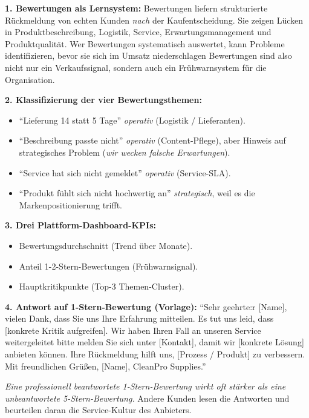 \documentclass[11pt,a4paper,oneside]{article}
\begin{document}
\begin{loesungbox}
\textbf{1. Bewertungen als Lernsystem:}
Bewertungen liefern strukturierte Rückmeldung von echten Kunden \emph{nach} der Kaufentscheidung. Sie zeigen Lücken in Produktbeschreibung, Logistik, Service, Erwartungsmanagement und Produktqualität. Wer Bewertungen systematisch auswertet, kann Probleme identifizieren, bevor sie sich im Umsatz niederschlagen \textendash{} Bewertungen sind also nicht nur ein Verkaufssignal, sondern auch ein Frühwarnsystem für die Organisation.

\textbf{2. Klassifizierung der vier Bewertungsthemen:}
\begin{itemize}
  \item ``Lieferung 14 statt 5 Tage'' \textendash{} \emph{operativ} (Logistik / Lieferanten).
  \item ``Beschreibung passte nicht'' \textendash{} \emph{operativ} (Content-Pflege), aber Hinweis auf strategisches Problem (\emph{wir wecken falsche Erwartungen}).
  \item ``Service hat sich nicht gemeldet'' \textendash{} \emph{operativ} (Service-SLA).
  \item ``Produkt fühlt sich nicht hochwertig an'' \textendash{} \emph{strategisch}, weil es die Markenpositionierung trifft.
\end{itemize}

\textbf{3. Drei Plattform-Dashboard-KPIs:}
\begin{itemize}
  \item Bewertungsdurchschnitt (Trend über Monate).
  \item Anteil 1-2-Stern-Bewertungen (Frühwarnsignal).
  \item Hauptkritikpunkte (Top-3 Themen-Cluster).
\end{itemize}

\textbf{4. Antwort auf 1-Stern-Bewertung (Vorlage):}
``Sehr geehrte:r [Name], vielen Dank, dass Sie uns Ihre Erfahrung mitteilen. Es tut uns leid, dass [konkrete Kritik aufgreifen]. Wir haben Ihren Fall an unseren Service weitergeleitet \textendash{} bitte melden Sie sich unter [Kontakt], damit wir [konkrete Lösung] anbieten können. Ihre Rückmeldung hilft uns, [Prozess / Produkt] zu verbessern. \\ Mit freundlichen Grüßen, [Name], CleanPro Supplies.''

\begin{merkbox}
\emph{Eine professionell beantwortete 1-Stern-Bewertung wirkt oft stärker als eine unbeantwortete 5-Stern-Bewertung.} Andere Kunden lesen die Antworten und beurteilen daran die Service-Kultur des Anbieters.
\end{merkbox}
\end{loesungbox}
\end{document}
